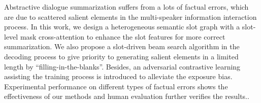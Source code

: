 Abstractive dialogue summarization suffers from a lots of factual errors, which are due to scattered salient elements in the multi-speaker information interaction process. In this work, we design a heterogeneous semantic slot graph with a slot-level mask cross-attention to enhance the slot features for more correct summarization. We also propose a slot-driven beam search algorithm in the decoding process to give priority to generating salient elements in a limited length by ``filling-in-the-blanks''. Besides, an adversarial contrastive learning assisting the training process is introduced to alleviate the exposure bias. Experimental performance on different types of factual errors shows the effectiveness of our methods and human evaluation further verifies the results..
